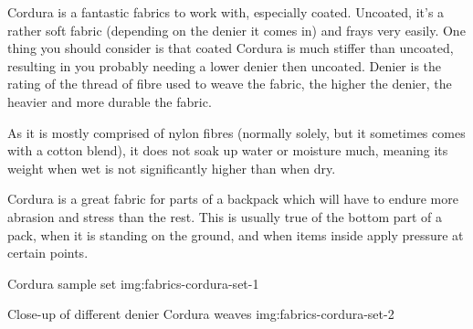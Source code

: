 Cordura is a fantastic fabrics to work with, especially coated. Uncoated, it's a rather soft fabric (depending on the denier it comes in) and frays very easily. One thing you should consider is that coated Cordura is much stiffer than uncoated, resulting in you probably needing a lower denier then uncoated. Denier is the rating of the thread of fibre used to weave the fabric, the higher the denier, the heavier and more durable the fabric.

As it is mostly comprised of nylon fibres (normally solely, but it sometimes comes with a cotton blend), it does not soak up water or moisture much, meaning its weight when wet is not significantly higher than when dry.

Cordura is a great fabric for parts of a backpack which will have to endure more abrasion and stress than the rest. This is usually true of the bottom part of a pack, when it is standing on the ground, and when items inside apply pressure at certain points.

{Cordura sample set}
{img:fabrics-cordura-set-1}

{Close-up of different denier Cordura weaves}
{img:fabrics-cordura-set-2}
